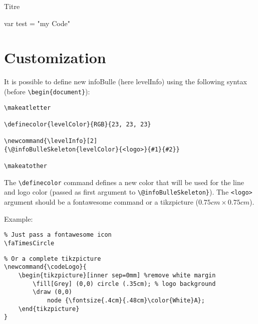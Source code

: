 \documentclass[a4paper, 11pt, oneside, fleqn]{article}
\begin{document}
\begin{CodeInfo}{Titre}
	\begin{CodeInfoLst}
var test = "my Code"
	\end{CodeInfoLst}
\end{CodeInfo}

\section{Customization}
It is possible to define new infoBulle (here levelInfo) using the following syntax (before \verb|\begin{document}|):

\begin{lstlisting}
\makeatletter

\definecolor{levelColor}{RGB}{23, 23, 23}

\newcommand{\levelInfo}[2]
{\@infoBulleSkeleton{levelColor}{<logo>}{#1}{#2}}

\makeatother
\end{lstlisting}

The \verb|\definecolor| command defines a new color that will be used for the line and logo color (passed as first argument to \verb|\@infoBulleSkeleton}|). The \verb|<logo>| argument should be a fontawesome command or a tikzpicture ($0.75cm \times 0.75cm$).

Example:
\begin{lstlisting}
% Just pass a fontawesome icon
\faTimesCircle
\end{lstlisting}

\begin{lstlisting}
% Or a complete tikzpicture
\newcommand{\codeLogo}{
	\begin{tikzpicture}[inner sep=0mm] %remove white margin
		\fill[Grey] (0,0) circle (.35cm); % logo background
		\draw (0,0)
			node {\fontsize{.4cm}{.48cm}\color{White}A};
	\end{tikzpicture}
}
\end{lstlisting}
\end{document}
